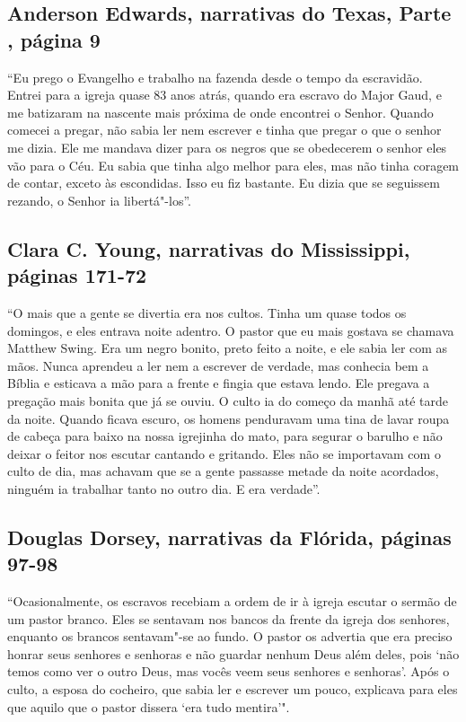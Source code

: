 \subsection{Anderson Edwards, narrativas do Texas, Parte , página 9} \label{ref80}

``Eu prego o Evangelho e trabalho na fazenda desde o tempo da
escravidão. Entrei para a igreja quase 83 anos atrás, quando era escravo
do Major Gaud, e me batizaram na nascente mais próxima de onde encontrei
o Senhor. Quando comecei a pregar, não sabia ler nem escrever e tinha
que pregar o que o senhor me dizia. Ele me mandava dizer para os negros
que se obedecerem o senhor eles vão para o Céu. Eu sabia que tinha algo
melhor para eles, mas não tinha coragem de contar, exceto às escondidas.
Isso eu fiz bastante. Eu dizia que se seguissem rezando, o Senhor ia
libertá"-los''.

\subsection{Clara C. Young, narrativas do Mississippi, páginas 171-72}
\label{ref322}

``﻿O mais que a gente se divertia era nos cultos. Tinha um quase todos
os domingos, e eles entrava noite adentro. O pastor que eu mais gostava %
se chamava Matthew Swing. Era um negro bonito, preto feito a noite, e
ele sabia ler com as mãos. Nunca aprendeu a ler nem a escrever de
verdade, mas conhecia bem a Bíblia e esticava a mão para a frente e
fingia que estava lendo. Ele pregava a pregação mais bonita que já se
ouviu. O culto ia do começo da manhã até tarde da noite. Quando ficava
escuro, os homens penduravam uma tina de lavar roupa de cabeça para
baixo na nossa igrejinha do mato, para segurar o barulho e não deixar o
feitor nos escutar cantando e gritando. Eles não se importavam com o
culto de dia, mas achavam que se a gente passasse metade da noite
acordados, ninguém ia trabalhar tanto no outro dia. E era verdade''.

\subsection{Douglas Dorsey, narrativas da Flórida, páginas 97-98} \label{ref71}

``Ocasionalmente, os escravos recebiam a ordem de ir à igreja escutar o
sermão de um pastor branco. Eles se sentavam nos bancos da frente da
igreja dos senhores, enquanto os brancos sentavam"-se ao fundo. O pastor
os advertia que era preciso honrar seus senhores e senhoras e não
guardar nenhum Deus além deles, pois `não temos como ver o outro Deus,
mas vocês veem seus senhores e senhoras'. Após o culto, a esposa do
cocheiro, que sabia ler e escrever um pouco, explicava para eles que
aquilo que o pastor dissera `era tudo mentira'".


